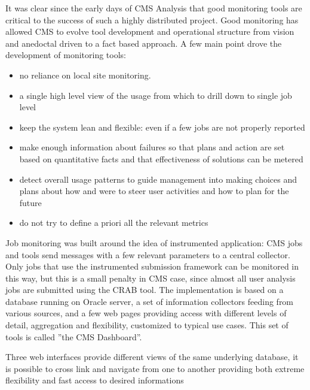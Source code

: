 It was clear since the early days of CMS Analysis that
good monitoring tools are critical to the success of such
a highly distributed project.
Good monitoring has allowed CMS to evolve tool development
and operational structure from vision and anedoctal driven
to a fact based approach.
A few main point drove the development of monitoring tools:
\begin{itemize}
\item no reliance on local site monitoring.
\item a single  high level view of the usage from which
  to drill down to single job level
\item   keep the system lean and flexible: even if a few
  jobs are not properly reported
\item make
  enough information about failures so that plans and
action are set
  based on quantitative facts and that effectiveness of solutions can be metered
\item detect overall usage patterns to guide management into making
 choices and plans about how and were to steer user activities and
 how to plan for the future
\item do not try to define a priori all the relevant metrics
\end{itemize}

Job monitoring was built around the idea of instrumented
application: CMS jobs and tools send messages with a few relevant
parameters to a central collector. Only jobs that use the
instrumented submission framework can be monitored in this way,
but this is a small penalty in CMS case, since almost
all user analysis jobs are submitted using the CRAB tool.
The implementation is based on a
database running on Oracle server, a set of information collectors
feeding from various sources, 
and a few web pages providing access with different levels
of detail, aggregation and flexibility, customized to
typical use cases. This set of tools is called ''the CMS Dashboard''.

Three web interfaces provide
different views of the same underlying database,
it is possible to cross link and navigate from one to another
providing both extreme flexibility and fast access to desired
informations

